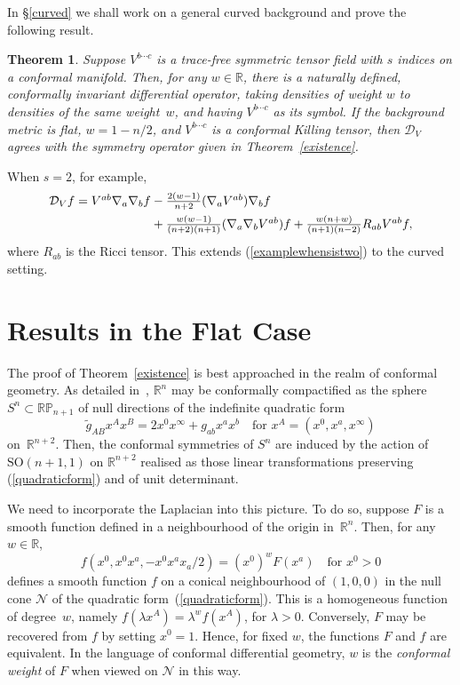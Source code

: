 \documentclass[a4paper,12pt]{amsart}
\newtheorem{thm}{Theorem}
\begin{document}
In \S\ref{curved} we shall work on a general curved background and prove the
following result.
\begin{thm}\label{betterthanexistence}
Suppose $V^{b\cdots c}$ is a trace-free symmetric tensor field with $s$ indices
on a conformal manifold. Then, for any $w\in{\mathbb R}$, there is a naturally
defined, conformally invariant differential operator, taking densities of
weight $w$ to densities of the same weight~$w$, and having $V^{b\cdots c}$ as
its symbol. If the background metric is flat, $w=1-n/2$, and $V^{b\cdots c}$ is
a conformal Killing tensor, then ${\mathcal D}_V$ agrees with the symmetry
operator given in Theorem~\ref{existence}.
\end{thm}
\noindent When $s=2$, for example,
$$\begin{array}l{\mathcal D}_Vf=
V^{ab}\nabla_a\nabla_bf-\frac{2(w-1)}{n+2}(\nabla_aV^{ab})\nabla_bf\\[5pt]
\phantom{{\mathcal D}_Vf=V^{ab}\nabla_a\nabla_bf}+
\frac{w(w-1)}{(n+2)(n+1)}(\nabla_a\nabla_bV^{ab})f+
\frac{w(n+w)}{(n+1)(n-2)}R_{ab}V^{ab}f,\end{array}$$
where $R_{ab}$ is the Ricci tensor. This extends
(\ref{examplewhensistwo}) to the curved setting.

\section{Results in the Flat Case}\label{flatresults}
The proof of Theorem~\ref{existence} is best approached in the realm of
conformal geometry. As detailed in~\cite[\S{2}]{eg}, ${\mathbb R}^n$ may be
conformally compactified as the sphere $S^n\subset{\mathbb{RP}}_{n+1}$
of null directions of the indefinite quadratic form
\begin{equation}\label{quadraticform}
\widetilde g_{AB}x^Ax^B=2x^0x^\infty+g_{ab}x^ax^b
\quad\mbox{for }x^A=(x^0,x^a,x^\infty)\end{equation}
on~${\mathbb R}^{n+2}$. Then, the conformal symmetries of $S^n$ are induced by
the action of ${\mathrm{SO}}(n+1,1)$ on ${\mathbb R}^{n+2}$ realised as those
linear transformations preserving (\ref{quadraticform}) and of unit
determinant.

We need to incorporate the Laplacian into this picture. To do so,
suppose $F$ is a smooth function defined in a neighbourhood of the
origin in~${\mathbb R}^n$. Then, for any $w\in{\mathbb R}$,
$$f(x^0,x^0x^a,-x^0x^ax_a/2)=(x^0)^wF(x^a)\quad\mbox{for }x^0>0$$
defines a smooth function $f$ on a conical neighbourhood of $(1,0,0)$ in the
null cone ${\mathcal N}$ of the quadratic form~(\ref{quadraticform}). This
is a homogeneous function of degree~$w$, namely
$f(\lambda x^A)=\lambda^wf(x^A)$, for $\lambda>0$.
Conversely, $F$ may be recovered from $f$ by setting $x^0=1$. Hence,
for fixed $w$, the functions $F$ and $f$ are equivalent. In the language of
conformal differential geometry, $w$ is the {\em conformal weight\/} of $F$
when viewed on ${\mathcal N}$ in this way.
\end{document}
